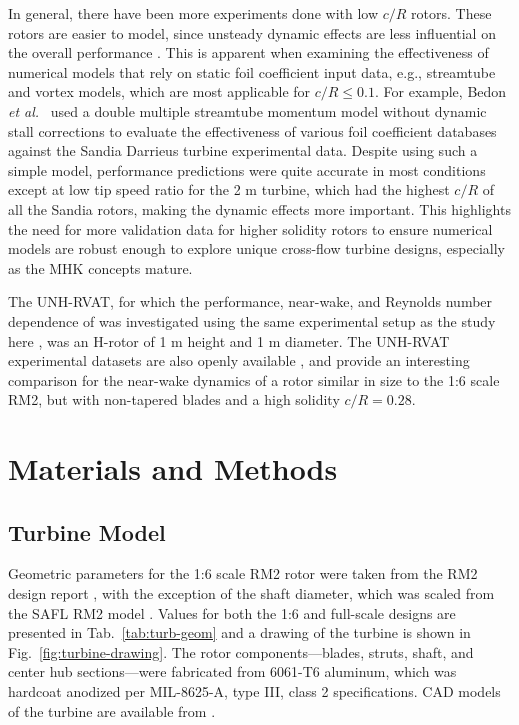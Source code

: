 \documentclass[10pt,letterpaper]{article}
\begin{document}
In general, there have been more experiments done with low $c/R$ rotors. These
rotors are easier to model, since unsteady dynamic effects are less influential
on the overall performance \cite{Strickland1981}. This is apparent when
examining the effectiveness of numerical models that rely on static foil
coefficient input data, e.g., streamtube and vortex models, which are most
applicable for $c/R \leq 0.1$. For example, Bedon \emph{et al.}~\cite{Bedon2014}
used a double multiple streamtube momentum model without dynamic stall
corrections to evaluate the effectiveness of various foil coefficient databases
against the Sandia Darrieus turbine experimental data. Despite using such a
simple model, performance predictions were quite accurate in most conditions
except at low tip speed ratio for the 2 m turbine, which had the highest $c/R$
of all the Sandia rotors, making the dynamic effects more important. This
highlights the need for more validation data for higher solidity rotors to
ensure numerical models are robust enough to explore unique cross-flow turbine
designs, especially as the MHK concepts mature.

The UNH-RVAT, for which the performance, near-wake, and Reynolds number
dependence of was investigated using the same experimental setup as the study
here \cite{Bachant2015-JoT, Bachant2016-Energies}, was an H-rotor of 1 m height
and 1 m diameter. The UNH-RVAT experimental datasets are also openly available
\cite{Bachant2014-RVAT-baseline, Bachant2016-RVAT-Re-dep}, and provide an
interesting comparison for the near-wake dynamics of a rotor similar in size to
the 1:6 scale RM2, but with non-tapered blades and a high solidity $c/R = 0.28$.


\section*{Materials and Methods}

\subsection*{Turbine Model}

Geometric parameters for the 1:6 scale RM2 rotor were taken from the RM2 design
report \cite{Barone2011}, with the exception of the shaft diameter, which was
scaled from the SAFL RM2 model \cite{Hill2014}. Values for both the 1:6 and
full-scale designs are presented in Tab.~\ref{tab:turb-geom} and a drawing of
the turbine is shown in Fig.~\ref{fig:turbine-drawing}. The rotor
components---blades, struts, shaft, and center hub sections---were fabricated
from 6061-T6 aluminum, which was hardcoat anodized per MIL-8625-A, type III,
class 2 specifications. CAD models of the turbine are available from
\cite{Bachant2015-RM2-CAD}.
\end{document}
